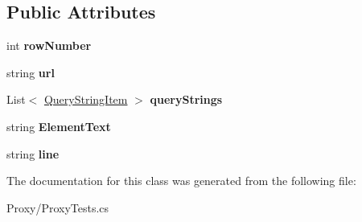 \subsection*{Public Attributes}
\begin{DoxyCompactItemize}
\item 
\hypertarget{class_proto_test_1_1_golem_1_1_proxy_1_1_proxy_tests_1_1_test_object_a6bc40a90f4a7617e537ac1986c3c03b0}{int {\bfseries row\-Number}}\label{class_proto_test_1_1_golem_1_1_proxy_1_1_proxy_tests_1_1_test_object_a6bc40a90f4a7617e537ac1986c3c03b0}

\item 
\hypertarget{class_proto_test_1_1_golem_1_1_proxy_1_1_proxy_tests_1_1_test_object_a3f44287fb08562dceb5ea86112857af0}{string {\bfseries url}}\label{class_proto_test_1_1_golem_1_1_proxy_1_1_proxy_tests_1_1_test_object_a3f44287fb08562dceb5ea86112857af0}

\item 
\hypertarget{class_proto_test_1_1_golem_1_1_proxy_1_1_proxy_tests_1_1_test_object_af1530d152e05b4dfa2bf2387b3e71a1b}{List$<$ \hyperlink{class_proto_test_1_1_golem_1_1_proxy_1_1_h_a_r_1_1_query_string_item}{Query\-String\-Item} $>$ {\bfseries query\-Strings}}\label{class_proto_test_1_1_golem_1_1_proxy_1_1_proxy_tests_1_1_test_object_af1530d152e05b4dfa2bf2387b3e71a1b}

\item 
\hypertarget{class_proto_test_1_1_golem_1_1_proxy_1_1_proxy_tests_1_1_test_object_a96d6292c84b47d8a74793762dbe13fc4}{string {\bfseries Element\-Text}}\label{class_proto_test_1_1_golem_1_1_proxy_1_1_proxy_tests_1_1_test_object_a96d6292c84b47d8a74793762dbe13fc4}

\item 
\hypertarget{class_proto_test_1_1_golem_1_1_proxy_1_1_proxy_tests_1_1_test_object_a954b8a657911e925ec8a1613b3be93d6}{string {\bfseries line}}\label{class_proto_test_1_1_golem_1_1_proxy_1_1_proxy_tests_1_1_test_object_a954b8a657911e925ec8a1613b3be93d6}

\end{DoxyCompactItemize}


The documentation for this class was generated from the following file\-:\begin{DoxyCompactItemize}
\item 
Proxy/Proxy\-Tests.\-cs\end{DoxyCompactItemize}
